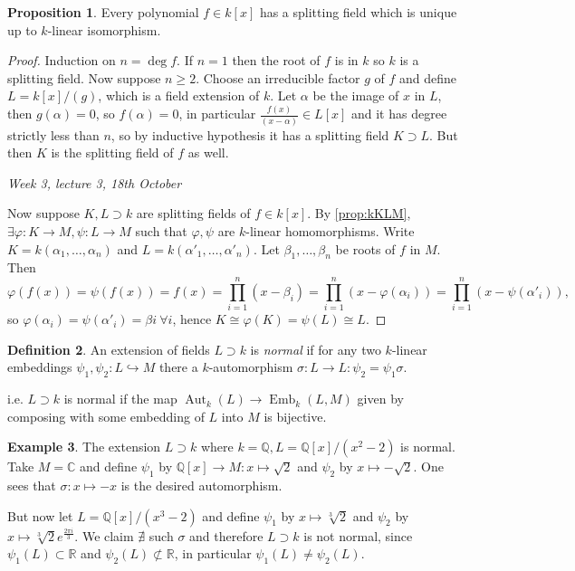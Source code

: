 \documentclass{article}
\newcommand{\Q}{\mathbb{Q}}
\newcommand{\R}{\mathbb{R}}
\newcommand{\C}{\mathbb{C}}
\newcommand{\Aut}{\operatorname{Aut}}
\newcommand{\Emb}{\operatorname{Emb}}
\theoremstyle{definition}
\newtheorem{defn}{Definition}[subsection]
\newtheorem{prop}[defn]{Proposition}
\newtheorem{example}[defn]{Example}
\begin{document}
\begin{prop}
\label{prop:SFexistandunique}
Every polynomial $f\in k[x]$ has a splitting field which is unique up to $k$-linear isomorphism.
\end{prop}
\begin{proof}
Induction on $n=\deg f$. If $n=1$ then the root of $f$ is in $k$ so $k$ is a splitting field. Now suppose $n\geq 2$. Choose an irreducible factor $g$ of $f$ and define $L=k[x]/(g)$, which is a field extension of $k$. Let $\alpha$ be the image of $x$ in $L$, then $g(\alpha)=0$, so $f(\alpha)=0$, in particular $\frac{f(x)}{(x-\alpha)}\in L[x]$ and it has degree strictly less than $n$, so by inductive hypothesis it has a splitting field $K\supset L$. But then $K$ is the splitting field of $f$ as well.

\begin{flushright}
\textit{Week 3, lecture 3, 18th October}
\end{flushright}

Now suppose $K,L\supset k$ are splitting fields of $f\in k[x]$. By \ref{prop:kKLM}, $\exists \varphi:K\rightarrow M,\psi:L\rightarrow M$ such that $\varphi,\psi$ are $k$-linear homomorphisms. Write $K=k(\alpha_1,\ldots,\alpha_n)$ and $L=k(\alpha'_1,\ldots,\alpha'_n)$. Let $\beta_1,\ldots,\beta_n$ be roots of $f$ in $M$. Then
\[
\varphi(f(x))=\psi(f(x))=f(x)=\prod_{i=1}^n (x-\beta_i)=\prod_{i=1}^n (x-\varphi(\alpha_i))=\prod_{i=1}^n (x-\psi(\alpha'_i)),
\]
so $\varphi(\alpha_i)=\psi(\alpha'_i)=\beta i \ \forall i$, hence $K\cong \varphi(K)=\psi(L)\cong L$.
\end{proof}


\begin{defn}
An extension of fields $L\supset k$ is \textit{normal} if for any two $k$-linear embeddings $\psi_1,\psi_2:L\hookrightarrow M$ there a $k$-automorphism $\sigma:L\rightarrow L:\psi_2=\psi_1\sigma$.

i.e. $L\supset k$ is normal if the map $\Aut_k(L)\rightarrow\Emb_k(L,M)$ given by composing with some embedding of $L$ into $M$ is bijective.
\end{defn}
\begin{example}
The extension $L\supset k$ where $k=\Q,L=\Q[x]/(x^2-2)$ is normal. Take $M=\C$ and define $\psi_1$ by $\Q[x]\rightarrow M:x\mapsto\sqrt 2$ and $\psi_2$ by $x\mapsto-\sqrt 2$. One sees that $\sigma:x\mapsto -x$ is the desired automorphism.

But now let $L=\Q[x]/(x^3-2)$ and define $\psi_1$ by $x\mapsto \sqrt[3]2$ and $\psi_2$ by $x\mapsto \sqrt[3]2 e^{\frac{2\pi i}{3}}$. We claim $\nexists$ such $\sigma$ and therefore $L\supset k$ is not normal, since $\psi_1(L)\subset\R$ and $\psi_2(L)\not\subset\R$, in particular $\psi_1(L)\neq\psi_2(L)$.
\end{example}
\end{document}
